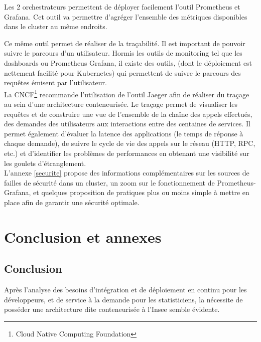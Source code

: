 \documentclass[11pt,fleqn]{book} %
\begin{document}
Les 2 orchestrateurs permettent de déployer facilement l'outil Prometheus et Grafana. Cet outil va permettre d'agréger l'ensemble des métriques disponibles dans le cluster au même endroits. 

Ce même outil permet de réaliser de la traçabilité. Il est important de pouvoir suivre le parcours d'un utilisateur. Hormis les outils de monitoring tel que les dashboards ou Prometheus Grafana, il existe des outils, (dont le déploiement est nettement facilité pour Kubernetes) qui permettent de suivre le parcours des requêtes émisent par l’utilisateur.\\

La CNCF\footnote{Cloud Native Computing Foundation} recommande l’utilisation de l’outil Jaeger afin de réaliser du traçage au sein d’une architecture conteneurisée. Le traçage permet de visualiser les requêtes et de construire une vue de l’ensemble de la chaîne des appels effectués, des demandes des utilisateurs aux interactions entre des centaines de services. Il permet également d’évaluer la latence des applications (le temps de réponse à chaque demande), de suivre le cycle de vie des appels sur le réseau (HTTP, RPC, etc.) et d’identifier les problèmes de performances en obtenant une visibilité sur les goulets d’étranglement.\\

L'annexe \ref{securite} propose des informations complémentaires sur les sources de failles de sécurité dans un cluster, un zoom sur le fonctionnement de Prometheus-Grafana, et quelques proposition de pratiques plus ou moins simple à mettre en place afin de garantir une sécurité optimale. 








\part{\textcolor{ocre}{Conclusion et annexes}}
\chapter{Conclusion}
\vspace{-2cm}

Après l'analyse des besoins d'intégration et de déploiement en continu pour les développeurs, et de service à la demande pour les statisticiens, la nécessite de posséder une architecture dite conteneurisée à l'Insee semble évidente. \newline
\end{document}
